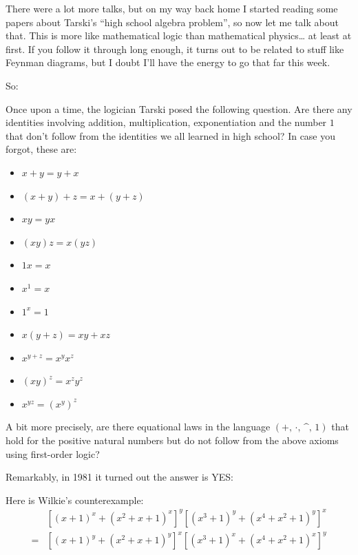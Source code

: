 \documentclass{article}
\def\tightlist{}
\renewcommand{\texttt}[1]{%
  \begingroup
  \ttfamily
  \begingroup\lccode`~=`/\lowercase{\endgroup\def~}{/\discretionary{}{}{}}%
  \begingroup\lccode`~=`[\lowercase{\endgroup\def~}{[\discretionary{}{}{}}%
  \begingroup\lccode`~=`.\lowercase{\endgroup\def~}{.\discretionary{}{}{}}%
  \catcode`/=\active\catcode`[=\active\catcode`.=\active
  \scantokens{#1\noexpand}%
  \endgroup
}
\begin{document}
There were a lot more talks, but on my way back home I started reading
some papers about Tarski's ``high school algebra problem'', so now let
me talk about that. This is more like mathematical logic than
mathematical physics\ldots{} at least at first. If you follow it through
long enough, it turns out to be related to stuff like Feynman diagrams,
but I doubt I'll have the energy to go that far this week.

So:

Once upon a time, the logician Tarski posed the following question. Are
there any identities involving addition, multiplication, exponentiation
and the number \(1\) that don't follow from the identities we all
learned in high school? In case you forgot, these are:

\begin{itemize}
\tightlist
\item
  \(x + y = y + x\)
\item
  \((x + y) + z = x + (y + z)\)
\item
  \(xy = yx\)
\item
  \((xy)z = x(yz)\)
\item
  \(1x=x\)
\item
  \(x^1 = x\)
\item
  \(1^x = 1\)
\item
  \(x(y + z) = xy + xz\)
\item
  \(x^{y + z} = x^y x^z\)
\item
  \((xy)^z = x^z y^z\)
\item
  \(x^{yz} = (x^y)^z\)
\end{itemize}

A bit more precisely, are there equational laws in the language
\((+,\,\cdot,\,\mbox{\textasciicircum},\,1)\) that hold for the positive
natural numbers but do not follow from the above axioms using
first-order logic?

Remarkably, in 1981 it turned out the answer is YES:


Here is Wilkie's counterexample: \[
  \begin{aligned}
    &[(x + 1)^x + (x^2 + x + 1)^x]^y  [(x^3 + 1)^y + (x^4 + x^2 + 1)^y]^x
  \\= &[(x + 1)^y + (x^2 + x + 1)^y]^x  [(x^3 + 1)^x + (x^4 + x^2 + 1)^x]^y
  \end{aligned}
\]
\end{document}
